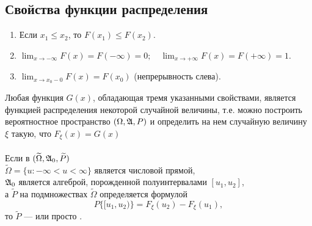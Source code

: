 \subsection{Свойства функции распределения}
\begin{enumerate}
    \item Если $x_1 \le x_2$, то $F(x_1) \le F(x_2)$.
    \item $\lim_{x\to-\infty} F(x) = F(-\infty) = 0; \quad
    \lim_{x\to+\infty} F(x) = F(+\infty) = 1$.
    \item $\lim_{x\to x_0-0} F(x) = F(x_0)$ (непрерывность слева).
\end{enumerate}
Любая функция $G(x)$, обладающая тремя указанными свойствами,
является функцией распределения некоторой случайной величины,
т.е. можно построить вероятностное пространство $(\Omega, \frak{A}, P)$
и определить на нем случайную величину $\xi$ такую, что $F_\xi(x) = G(x)$\\
\\
Если в $(\widetilde\Omega, \frak{A}_0, \widetilde{P})$\\
$\widetilde\Omega = \{u\colon -\infty < u < \infty\}$ является числовой прямой,\\
$\frak{A}_0$ является алгеброй, порожденной полуинтервалами $[u_1, u_2]$,\\
а $\widetilde{P}$ на подмножествах $\widetilde\Omega$ определяется формулой
\begin{equation*}
    P\{[u_1, u_2)\} = F_\xi(u_2) - F_\xi(u_1),
\end{equation*}
то $\widetilde{P}$ --- 
или просто .

